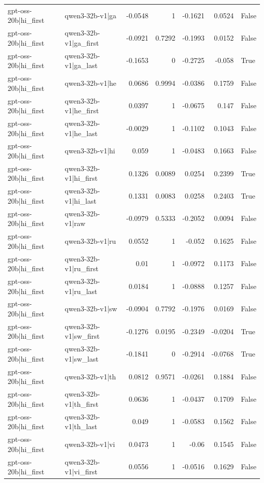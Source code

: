 \begin{table}
\begin{tabular}{l l r r r r l}
gpt-oss-20b|hi_first & qwen3-32b-v1|ga & -0.0548 & 1 & -0.1621 & 0.0524 & False \\
gpt-oss-20b|hi_first & qwen3-32b-v1|ga_first & -0.0921 & 0.7292 & -0.1993 & 0.0152 & False \\
gpt-oss-20b|hi_first & qwen3-32b-v1|ga_last & -0.1653 & 0 & -0.2725 & -0.058 & True \\
gpt-oss-20b|hi_first & qwen3-32b-v1|he & 0.0686 & 0.9994 & -0.0386 & 0.1759 & False \\
gpt-oss-20b|hi_first & qwen3-32b-v1|he_first & 0.0397 & 1 & -0.0675 & 0.147 & False \\
gpt-oss-20b|hi_first & qwen3-32b-v1|he_last & -0.0029 & 1 & -0.1102 & 0.1043 & False \\
gpt-oss-20b|hi_first & qwen3-32b-v1|hi & 0.059 & 1 & -0.0483 & 0.1663 & False \\
gpt-oss-20b|hi_first & qwen3-32b-v1|hi_first & 0.1326 & 0.0089 & 0.0254 & 0.2399 & True \\
gpt-oss-20b|hi_first & qwen3-32b-v1|hi_last & 0.1331 & 0.0083 & 0.0258 & 0.2403 & True \\
gpt-oss-20b|hi_first & qwen3-32b-v1|raw & -0.0979 & 0.5333 & -0.2052 & 0.0094 & False \\
gpt-oss-20b|hi_first & qwen3-32b-v1|ru & 0.0552 & 1 & -0.052 & 0.1625 & False \\
gpt-oss-20b|hi_first & qwen3-32b-v1|ru_first & 0.01 & 1 & -0.0972 & 0.1173 & False \\
gpt-oss-20b|hi_first & qwen3-32b-v1|ru_last & 0.0184 & 1 & -0.0888 & 0.1257 & False \\
gpt-oss-20b|hi_first & qwen3-32b-v1|sw & -0.0904 & 0.7792 & -0.1976 & 0.0169 & False \\
gpt-oss-20b|hi_first & qwen3-32b-v1|sw_first & -0.1276 & 0.0195 & -0.2349 & -0.0204 & True \\
gpt-oss-20b|hi_first & qwen3-32b-v1|sw_last & -0.1841 & 0 & -0.2914 & -0.0768 & True \\
gpt-oss-20b|hi_first & qwen3-32b-v1|th & 0.0812 & 0.9571 & -0.0261 & 0.1884 & False \\
gpt-oss-20b|hi_first & qwen3-32b-v1|th_first & 0.0636 & 1 & -0.0437 & 0.1709 & False \\
gpt-oss-20b|hi_first & qwen3-32b-v1|th_last & 0.049 & 1 & -0.0583 & 0.1562 & False \\
gpt-oss-20b|hi_first & qwen3-32b-v1|vi & 0.0473 & 1 & -0.06 & 0.1545 & False \\
gpt-oss-20b|hi_first & qwen3-32b-v1|vi_first & 0.0556 & 1 & -0.0516 & 0.1629 & False \\

\end{tabular}
\end{table}
